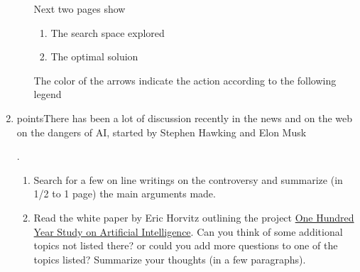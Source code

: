 \documentclass[11pt]{article}  %
\begin{document}
\begin{enumerate}
\begin{enumerate}
      Next two pages show 
        \begin{enumerate}
          \item The search space explored
          \item The optimal soluion
        \end{enumerate}
    The color of the arrows indicate the action according to the following
    legend
    \par{}
    
    
    \end{enumerate}
    \item {} points\rbrack There has been a lot of discussion recently
    in the news and on the web on the dangers of AI, started by Stephen Hawking and Elon
    Musk
    \par.
    \begin{enumerate}
    \item Search for a few on line writings on the controversy and summarize (in
    1/2 to 1 page) the main arguments made.
    \item Read the white paper by Eric Horvitz outlining the project
    \href{https://stanford.app.box.com/s/266hrhww2l3gjoy9euar}{One Hundred Year Study on Artificial Intelligence}.
    Can you think of some additional topics not listed there? or could you add more
    questions to one of the topics listed? Summarize your thoughts (in a few
    paragraphs).
    \end{enumerate}
    \end{enumerate}
\end{document}
